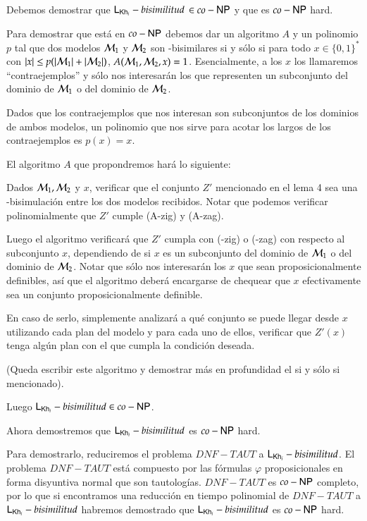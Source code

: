\begin{demostracion}
    Debemos demostrar que $\mathsf{L}_{\mathsf{Kh}_i}-bisimilitud$ $\in co-\rm\textsf{NP}$ y que es $co-\rm\textsf{NP}$ hard.

    Para demostrar que está en $co-\rm\textsf{NP}$ debemos dar un algoritmo $A$ y un polinomio $p$ tal que dos modelos $\mathcal{M}_1$ y $\mathcal{M}_2$ son \KHilogic-bisimilares si y sólo si para todo $x \in \{0,1\}^*$ con $|x| \le p(|\mathcal{M}_1|+|\mathcal{M}_2|)$,  $A(\mathcal{M}_1,\mathcal{M}_2,x) = 1$. Esencialmente, a los $x$ los llamaremos ``contraejemplos'' y sólo nos interesarán los que representen un subconjunto del dominio de $\mathcal{M}_1$ o del dominio de $\mathcal{M}_2$.

\medskip\medskip

    Dados que los contraejemplos que nos interesan son subconjuntos de los dominios de ambos modelos, un polinomio que nos sirve para acotar los largos de los contraejemplos es $p(x) = x$. 

\medskip\medskip
    El algoritmo $A$ que propondremos hará lo siguiente:
    
    Dados $\mathcal{M}_1, \mathcal{M}_2$ y $x$, verificar que el conjunto $Z'$ mencionado en el lema 4 sea una \KHilogic-bisimulación entre los dos modelos recibidos. Notar que podemos verificar polinomialmente que $Z'$ cumple (A-zig) y (A-zag).

    Luego el algoritmo verificará que $Z'$ cumpla con (\KHilogic-zig) o (\KHilogic-zag) con respecto al subconjunto $x$,  dependiendo de si $x$ es un subconjunto del dominio de $\mathcal{M}_1$ o del dominio de $\mathcal{M}_2$. Notar que sólo nos interesarán los $x$ que sean proposicionalmente definibles, así que el algoritmo deberá encargarse de chequear que $x$ efectivamente sea un conjunto proposicionalmente definible. 

    En caso de serlo, simplemente analizará a qué conjunto se puede llegar desde $x$ utilizando cada plan del modelo y para cada uno de ellos, verificar que $Z'(x)$ tenga algún plan con el que cumpla la condición deseada. 
    
    (Queda escribir este algoritmo y demostrar más en profundidad el si y sólo si mencionado). 

\medskip\medskip

    Luego $\mathsf{L}_{\mathsf{Kh}_i}-bisimilitud \in co-\rm\textsf{NP}$.
    
\medskip\medskip

    Ahora demostremos que $\mathsf{L}_{\mathsf{Kh}_i}-bisimilitud$ es $co-\rm\textsf{NP}$ hard.

    Para demostrarlo, reduciremos el problema $DNF-TAUT$ a $\mathsf{L}_{\mathsf{Kh}_i}-bisimilitud$. El problema $DNF-TAUT$ está compuesto por las fórmulas $\varphi$ proposicionales en forma disyuntiva normal que son tautologías. $DNF-TAUT$ es $co-\rm\textsf{NP}$ completo, por lo que si encontramos una reducción en tiempo polinomial de $DNF-TAUT$ a $\mathsf{L}_{\mathsf{Kh}_i}-bisimilitud$ habremos demostrado que $\mathsf{L}_{\mathsf{Kh}_i}-bisimilitud$ es $co-\rm\textsf{NP}$ hard.


\end{demostracion}
